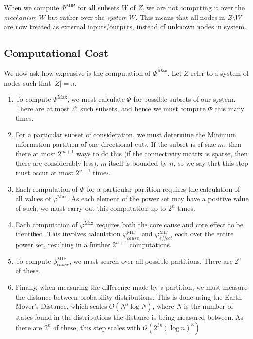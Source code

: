 \begin{remark}
	When we compute $\Phi^{\text{MIP}} $ for all subsets $W$ of $Z$, we are not computing it over the \textit{mechanism} $W$ but rather over the \textit{system} $W$. This means that all nodes in $Z \setminus W$ are now treated as external inputs/outputs, instead of unknown nodes in system.
\end{remark}

\subsection{Computational Cost}
We now ask how expensive is the computation of $\Phi^{Max}$. Let $Z$ refer to a system of nodes such that $|Z| = n$.

\begin{enumerate}
	\item To compute $\Phi^{\text{Max}}$, we must calculate $\Phi$ for possible subsets of our system. There are at most $2^n$ such subsets, and hence we must compute $\Phi$ this many times.
	\item For a particular subset of consideration, we must determine the Minimum information partition of one directional cuts. If the subset is of size $m$, then there at most $2^{m+1}$ ways to do this (if the connectivity matrix is sparse, then there are considerably less). $m$ itself is bounded by $n$, so we say that this step must occur at most $2^{n+1}$ times.
	\item Each computation of $\Phi$ for a particular partition requires the calculation of all values of $\varphi^{\text{Max}}$. As each element of the power set may have a positive value of such, we must carry out this computation up to $2^n$ times.
	\item Each computation of $\varphi^{\text{Max}}$ requires both the core cause and core effect to be identified. This involves calculation $\varphi^{\text{MIP}}_{cause}$ and $\varphi^{\text{MIP}}_{effect}$ each over the entire power set, resulting in a further $2^{n+1}$ computations.  
	\item To compute $\phi_{cause}^{\text{MIP}}$, we must search over all possible partitions. There are $2^n$ of these.
	\item Finally, when measuring the difference made by a partition, we must measure the distance between probability distributions. This is done using the Earth Mover's Distance, which scales $O(N^3 \log N)$, where $N$ is the number of states found in the distributions the distance is being measured between. As there are $2^n$ of these, this step scales with $O(2^{3n} (\log n)^3)$
\end{enumerate}

